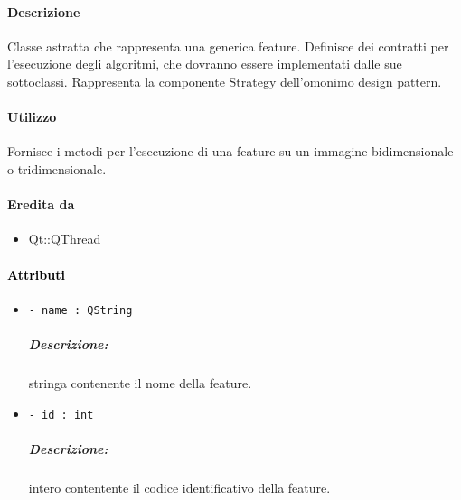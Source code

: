 \paragraph{Descrizione \\} Classe astratta che rappresenta una generica feature\g{}. Definisce dei contratti per l'esecuzione degli algoritmi, che dovranno essere implementati dalle sue sottoclassi. Rappresenta la componente Strategy dell'omonimo design pattern\g{}.

\paragraph{Utilizzo\\} Fornisce i metodi per l'esecuzione di una feature\g{} su un immagine bidimensionale o tridimensionale.

\paragraph{Eredita da}
\begin{itemize}
	\item Qt::QThread
\end{itemize}

\paragraph{\textcolor{black}{Attributi\\}}
	\begin{itemize}
		\item \color{teal}\verb!- name : QString !
		\color{black}
		\subparagraph{Descrizione:} stringa contenente il nome della feature\g{}.
		\item \color{teal}\verb!- id : int !
		\color{black}
		\subparagraph{Descrizione:} intero contentente il codice identificativo della feature\g{}.
	\end{itemize}

